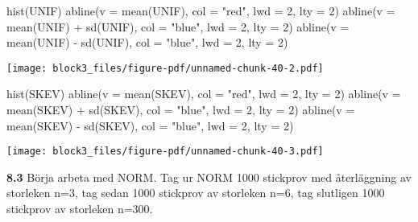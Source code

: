 \documentclass[
  letterpaper,
  DIV=11,
  numbers=noendperiod]{scrartcl}
\newenvironment{Shaded}{\begin{snugshade}}{\end{snugshade}}
\newcommand{\AttributeTok}[1]{\textcolor[rgb]{0.40,0.45,0.13}{#1}}
\newcommand{\DecValTok}[1]{\textcolor[rgb]{0.68,0.00,0.00}{#1}}
\newcommand{\FunctionTok}[1]{\textcolor[rgb]{0.28,0.35,0.67}{#1}}
\newcommand{\NormalTok}[1]{\textcolor[rgb]{0.00,0.23,0.31}{#1}}
\newcommand{\SpecialCharTok}[1]{\textcolor[rgb]{0.37,0.37,0.37}{#1}}
\newcommand{\StringTok}[1]{\textcolor[rgb]{0.13,0.47,0.30}{#1}}
\begin{document}
\begin{Shaded}
\begin{Highlighting}[]
\FunctionTok{hist}\NormalTok{(UNIF)}
\FunctionTok{abline}\NormalTok{(}\AttributeTok{v =} \FunctionTok{mean}\NormalTok{(UNIF), }\AttributeTok{col =} \StringTok{"red"}\NormalTok{, }\AttributeTok{lwd =} \DecValTok{2}\NormalTok{, }\AttributeTok{lty =} \DecValTok{2}\NormalTok{)}
\FunctionTok{abline}\NormalTok{(}\AttributeTok{v =} \FunctionTok{mean}\NormalTok{(UNIF) }\SpecialCharTok{+} \FunctionTok{sd}\NormalTok{(UNIF), }\AttributeTok{col =} \StringTok{"blue"}\NormalTok{, }\AttributeTok{lwd =} \DecValTok{2}\NormalTok{, }\AttributeTok{lty =} \DecValTok{2}\NormalTok{)}
\FunctionTok{abline}\NormalTok{(}\AttributeTok{v =} \FunctionTok{mean}\NormalTok{(UNIF) }\SpecialCharTok{{-}} \FunctionTok{sd}\NormalTok{(UNIF), }\AttributeTok{col =} \StringTok{"blue"}\NormalTok{, }\AttributeTok{lwd =} \DecValTok{2}\NormalTok{, }\AttributeTok{lty =} \DecValTok{2}\NormalTok{) }
\end{Highlighting}
\end{Shaded}

\texttt{[image: block3\_files/figure-pdf/unnamed-chunk-40-2.pdf]}

\begin{Shaded}
\begin{Highlighting}[]
\FunctionTok{hist}\NormalTok{(SKEV)}
\FunctionTok{abline}\NormalTok{(}\AttributeTok{v =} \FunctionTok{mean}\NormalTok{(SKEV), }\AttributeTok{col =} \StringTok{"red"}\NormalTok{, }\AttributeTok{lwd =} \DecValTok{2}\NormalTok{, }\AttributeTok{lty =} \DecValTok{2}\NormalTok{)}
\FunctionTok{abline}\NormalTok{(}\AttributeTok{v =} \FunctionTok{mean}\NormalTok{(SKEV) }\SpecialCharTok{+} \FunctionTok{sd}\NormalTok{(SKEV), }\AttributeTok{col =} \StringTok{"blue"}\NormalTok{, }\AttributeTok{lwd =} \DecValTok{2}\NormalTok{, }\AttributeTok{lty =} \DecValTok{2}\NormalTok{)}
\FunctionTok{abline}\NormalTok{(}\AttributeTok{v =} \FunctionTok{mean}\NormalTok{(SKEV) }\SpecialCharTok{{-}} \FunctionTok{sd}\NormalTok{(SKEV), }\AttributeTok{col =} \StringTok{"blue"}\NormalTok{, }\AttributeTok{lwd =} \DecValTok{2}\NormalTok{, }\AttributeTok{lty =} \DecValTok{2}\NormalTok{)}
\end{Highlighting}
\end{Shaded}

\texttt{[image: block3\_files/figure-pdf/unnamed-chunk-40-3.pdf]}

\textbf{8.3} Börja arbeta med NORM. Tag ur NORM 1000 stickprov med
återläggning av storleken n=3, tag sedan 1000 stickprov av storleken
n=6, tag slutligen 1000 stickprov av storleken n=300.
\end{document}
